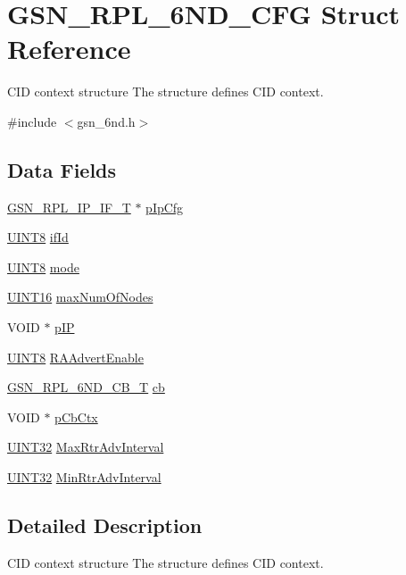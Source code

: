 \hypertarget{a00193}{
\section{GSN\_\-RPL\_\-6ND\_\-CFG Struct Reference}
\label{a00193}
}


CID context structure The structure defines CID context.  




{\ttfamily \#include $<$gsn\_\-6nd.h$>$}

\subsection*{Data Fields}
\begin{DoxyCompactItemize}
\item 
\hyperlink{a00203}{GSN\_\-RPL\_\-IP\_\-IF\_\-T} $\ast$ \hyperlink{a00193_aee20ba6a350c363c484ef6f95a001753}{pIpCfg}
\item 
\hyperlink{a00660_gab27e9918b538ce9d8ca692479b375b6a}{UINT8} \hyperlink{a00193_a0f9aaec90ed26330a798d110bc4bc237}{ifId}
\item 
\hyperlink{a00660_gab27e9918b538ce9d8ca692479b375b6a}{UINT8} \hyperlink{a00193_a7d61d79fa98a45545166420dec0d8f3d}{mode}
\item 
\hyperlink{a00660_ga09f1a1fb2293e33483cc8d44aefb1eb1}{UINT16} \hyperlink{a00193_a53dccd30559b2a4bdf7c48d3f71bc8d3}{maxNumOfNodes}
\item 
VOID $\ast$ \hyperlink{a00193_aea015861cc964f97c61cc651f155451e}{pIP}
\item 
\hyperlink{a00660_gab27e9918b538ce9d8ca692479b375b6a}{UINT8} \hyperlink{a00193_a775fba1092bccc056e88151dc1547f8f}{RAAdvertEnable}
\item 
\hyperlink{a00473_a746a04234ff43643fc1948ada254379c}{GSN\_\-RPL\_\-6ND\_\-CB\_\-T} \hyperlink{a00193_a8bde91b6ce377d59f0b80c03bdd469b9}{cb}
\item 
VOID $\ast$ \hyperlink{a00193_a040e2d4627baec5f0f81086400c1b66a}{pCbCtx}
\item 
\hyperlink{a00660_gae1e6edbbc26d6fbc71a90190d0266018}{UINT32} \hyperlink{a00193_aeac054366f1a4a6cc391b9385dcf1f9a}{MaxRtrAdvInterval}
\item 
\hyperlink{a00660_gae1e6edbbc26d6fbc71a90190d0266018}{UINT32} \hyperlink{a00193_af23e4d0983e78423d6d5349772603744}{MinRtrAdvInterval}
\end{DoxyCompactItemize}


\subsection{Detailed Description}
CID context structure The structure defines CID context. 

